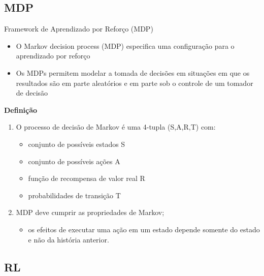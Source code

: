 \subsection{MDP}

\begin{frame}{Framework de Aprendizado por Reforço (MDP)}
  \begin{itemize}
    \item O \alert{Markov decision process (MDP)} especifica uma configuração para o aprendizado por reforço
    \item Os MDPs permitem modelar a tomada de decisões em situações em que os resultados são em parte aleatórios e em parte sob o controle de um tomador de decisão
  \end{itemize}
  \textbf{Definição}
    \begin{enumerate}
        \item O processo de decisão de Markov é uma 4-tupla (S,A,R,T) com:
        \begin{itemize}
            \item conjunto de possíveis \alert{estados} S
            \item conjunto de possíveis \alert{ações} A
            \item \alert{função de recompensa} de valor real R
            \item \alert{probabilidades de transição} T
        \end{itemize}
        \item MDP deve cumprir as propriedades de Markov;
        \begin{itemize}
            \item os efeitos de executar uma ação em um estado depende somente do estado e não da história anterior.
        \end{itemize}
    \end{enumerate}
\end{frame}

\subsection{RL}

